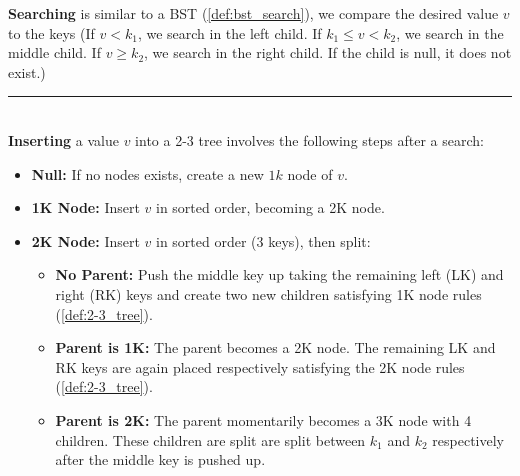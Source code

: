 \begin{Def}

    \label{def:2-3_tree_search_insert}

    \textbf{Searching} is similar to a BST (\ref{def:bst_search}), we compare the desired value $v$ to the keys
    (If $v < k_1$, we search in the left child.
        If $k_1 \leq v < k_2$, we search in the middle child.
        If $v \geq k_2$, we search in the right child.
        If the child is null, it does not exist.)

    \noindent
    \rule{\textwidth}{0.4pt}\\

    \noindent
    \textbf{Inserting} a value $v$ into a 2-3 tree involves the following steps after a search:
    \begin{itemize}
        \item \textbf{Null:} If no nodes exists, create a new $1k$ node of $v$.
        \item \textbf{1K Node:} Insert $v$ in sorted order, becoming a 2K node.
        \item \textbf{2K Node:} Insert $v$ in sorted order (3 keys), then split:
            \begin{itemize}
                \item \textbf{No Parent:} Push the middle key up taking the remaining left (LK) and right (RK) keys and create two new children satisfying 1K node rules (\ref{def:2-3_tree}).
                \item \textbf{Parent is 1K:} The parent becomes a 2K node. The remaining LK and RK keys are again placed
                respectively satisfying the 2K node rules (\ref{def:2-3_tree}).
                \item \textbf{Parent is 2K:} The parent momentarily becomes a 3K node with 4 children. These children are split 
                are split between $k_1$ and $k_2$ respectively after the middle key is pushed up.
            \end{itemize}
    \end{itemize}
\end{Def}


